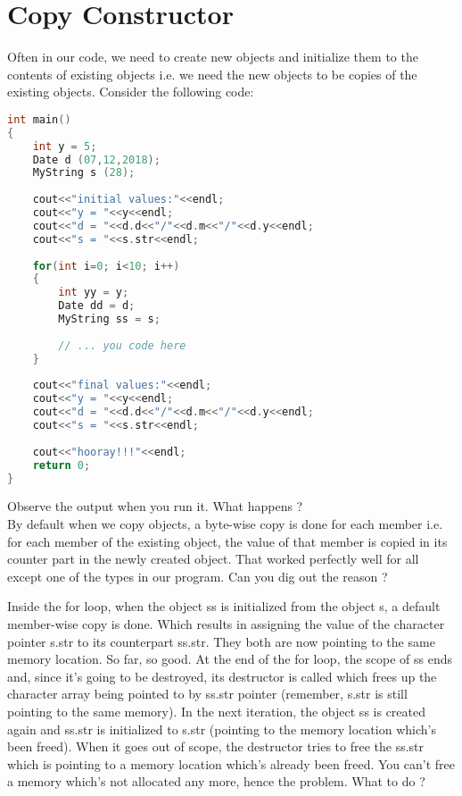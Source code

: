 \documentclass[11pt,fleqn]{book} %
\begin{document}
\section{Copy Constructor}
Often in our code, we need to create new objects and initialize them to the contents of existing objects i.e. we need the new objects to be copies of the existing objects. Consider the following code:
\begin{lstlisting}[language=C++, caption = Need for Copy Ctor]
int main() 
{
	int y = 5;
	Date d (07,12,2018);
	MyString s (28);
	
	cout<<"initial values:"<<endl;
	cout<<"y = "<<y<<endl;
	cout<<"d = "<<d.d<<"/"<<d.m<<"/"<<d.y<<endl;
	cout<<"s = "<<s.str<<endl;
	
	for(int i=0; i<10; i++)
	{	
		int yy = y;
		Date dd = d;
		MyString ss = s;
		
		// ... you code here
	}
	
	cout<<"final values:"<<endl;
	cout<<"y = "<<y<<endl;
	cout<<"d = "<<d.d<<"/"<<d.m<<"/"<<d.y<<endl;
	cout<<"s = "<<s.str<<endl;
	
	cout<<"hooray!!!"<<endl;
	return 0;
}
\end{lstlisting}

\noindent Observe the output when you run it. What happens ?
\smallskip
~\\

\noindent By default when we copy objects, a byte-wise copy is done for each member i.e. for each member of the existing object, the value of that member is copied in its counter part in the newly created object. That worked perfectly well for all except one of the types in our program. Can you dig out the reason ?

Inside the for loop, when the object ss is initialized from the object s, a default member-wise copy is done. Which results in assigning the value of the character pointer s.str to its counterpart ss.str. They both are now pointing to the same memory location. So far, so good. At the end of the for loop, the scope of ss ends and, since it's going to be destroyed, its destructor is called which frees up the character array being pointed to by ss.str pointer (remember, s.str is still pointing to the same memory). In the next iteration, the object ss is created again and ss.str is initialized to s.str (pointing to the memory location which's been freed). When it goes out of scope, the destructor tries to free the ss.str which is pointing to a memory location which's already been freed. You can't free a memory which's not allocated any more, hence the problem. What to do ?
\end{document}

